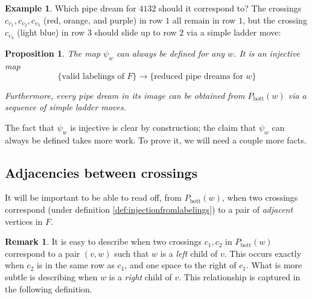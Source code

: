 \documentclass{article}
\newcommand{\cross}[2]{
\begin{scope}[xshift=#1cm,yshift=-#2cm]
\draw[very thick] (0,-0.5) -- (0.45,-0.5);
\draw[very thick] (0.55,-0.5) -- (1,-0.5);
    \draw[very thick] (0.5,0) -- (0.5,-1);
\end{scope}
}%
\newcommand{\arcs}[2]{
\begin{scope}[xshift=#1cm,yshift=-#2cm]
    \draw[very thick] (0,-0.5) arc (-90:0:0.5cm);
    \draw[very thick] (0.5,-1) arc (180:90:0.5cm);
\end{scope}
}%
\newcommand{\GRIDwitnum}[1]{
\begin{scope}
\foreach \n in {1,...,#1} \node at (\n-0.5,0.5){$\bm{\mathsf{\n}}$};
\foreach \n in {1,...,#1} \node at (-0.5,-\n+0.5){$\bm{\mathsf{\n}}$};
\draw[black!25!white] (0,-#1cm) |- (#1cm,0);
\foreach \n in {0,...,{#1}} \draw[black!25!white] (\n+1,0) -- (\n+1,\n-#1);
\foreach \n in {0,...,{#1}} \draw[black!25!white] (0,-\n-1) -- (#1-\n,-\n-1);
\foreach \n in {1,...,{#1}} \draw[very thick] (\n-1,-#1+\n-0.5) arc (-90:0:0.5cm);
\end{scope}
} %
\newtheorem{proposition}[theorem]{Proposition}
\theoremstyle{definition} %
\newtheorem{example}[theorem]{Example}
\newtheorem{remark}[theorem]{Remark}
\begin{document}
\begin{example}
Which pipe dream for $4132$ should it correspond to? The crossings $c_{v_1}, c_{v_2}, c_{v_3}$ (red, orange, and purple) in row $1$ all remain in row $1$, but the crossing $c_{v_4}$ (light blue) in row $3$ should slide up to row $2$ via a simple ladder move:
\begin{center}

\end{center}

\end{example}

\begin{proposition}\label{prop:psiiswell-defined}
    The map $\psi_w$ can always be defined for any $w$. It is an injective map
    \[\{\text{valid labelings of } F\} \to \{\text{reduced pipe dreams for } w\}\]

    Furthermore, every pipe dream in its image can be obtained from $P_{\text{bott}}(w)$ via a sequence of simple ladder moves. 
\end{proposition}

The fact that $\psi_w$ is injective is clear by construction; the claim that $\psi_w$ can always be defined takes more work. To prove it, we will need a couple more facts. 

\subsection{Adjacencies between crossings}

It will be important to be able to read off, from $P_{\text{bott}}(w)$, when two crossings correspond (under definition \ref{def:injectionfromlabelings}) to a pair of \textit{adjacent} vertices in $F$. 
\vspace{1em}

\begin{remark}
    It is easy to describe when two crossings $c_1, c_2$ in $P_{\text{bott}}(w)$ correspond to a pair $(v,w)$ such that $w$ is a \textit{left} child of $v$. This occurs exactly when $c_2$ is in the same row as $c_1$, and one space to the right of $c_1$. What is more subtle is describing when $w$ is a \textit{right} child of $v$. This relationship is captured in the following definition.  
\end{remark}
\vspace{1em}
\end{document}
